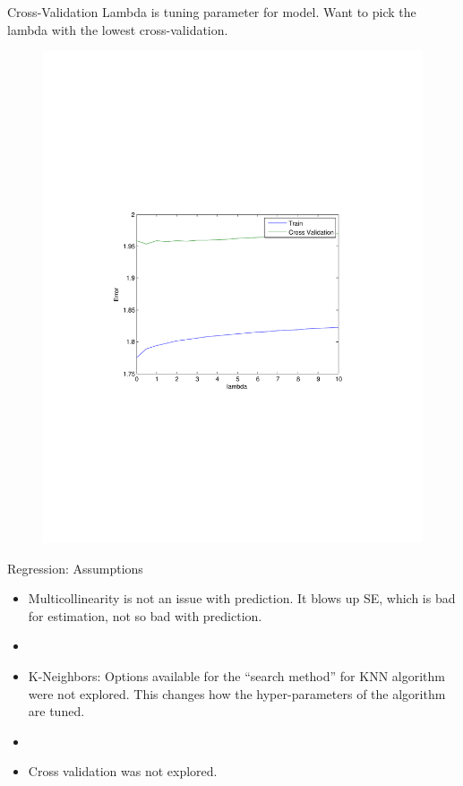 \documentclass{beamer}
\begin{document}
\begin{frame}{Cross-Validation}
Lambda is tuning parameter for model. Want to pick the lambda with the lowest cross-validation. 

	\begin{figure}
		\centering
		\includegraphics[scale=0.5]{../Kalbi/validationcurve.pdf}
	\end{figure}

\end{frame}


\begin{frame}{Regression: Assumptions}
	\begin{itemize}
	\item Multicollinearity is not an issue with prediction. It blows up SE, which is bad for estimation, not so bad with prediction.
	\item[]
	\item K-Neighbors: Options available for the ``search method'' for KNN algorithm were not explored. This changes how the hyper-parameters of the algorithm are tuned.
	\item[]
	\item Cross validation was not explored.
	\end{itemize}
\end{frame}
\end{document}

